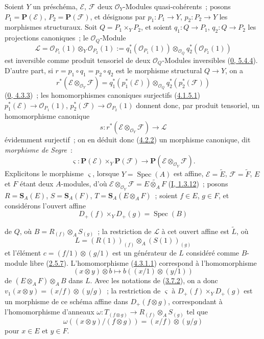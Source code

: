 \begin{env}[4.3.1]
\label{II.4.3.1-fr}
Soient $Y$ un préschéma, $\mathcal{E}$, $\mathcal{F}$ deux
$\mathcal{O}_Y$-Modules quasi-cohérents~; posons
$P_1=\mathbf{P}(\mathcal{E})$, $P_2=\mathbf{P}(\mathcal{F})$, et désignons
par $p_1:P_1\to Y$, $p_2:P_2\to Y$ les morphismes structuraux. Soit
$Q=P_1\times_YP_2$, et soient $q_1:Q\to P_1$, $q_2:Q\to P_2$ les
projections canoniques~; le $\mathcal{O}_Q$-Module
\[
  \mathcal{L}=\mathcal{O}_{P_1}(1)\otimes_Y\mathcal{O}_{P_2}(1)
  :=q_1^*(\mathcal{O}_{P_1}(1))\otimes_{\mathcal{O}_Q}
  q_2^*(\mathcal{O}_{P_2}(1))
\]
est inversible comme produit tensoriel de deux $\mathcal{O}_Q$-Modules
inversibles (\hyperref[0.5.4.4-fr]{0, 5.4.4}). D'autre part, si
$r=p_1\circ q_1=p_2\circ q_2$ est le morphisme structural $Q\to Y$, on a
\[
  r^*(\mathcal{E}\otimes_{\mathcal{O}_Y}\mathcal{F})
  =q_1^*(p_1^*(\mathcal{E}))\otimes_{\mathcal{O}_Q}
  q_2^*(p_2^*(\mathcal{F}))
\]
(\hyperref[0.4.3.3-fr]{0, 4.3.3})~; les homomorphismes canoniques surjectifs
(\hyperref[II.4.1.5.1-fr]{4.1.5.1})
$p_1^*(\mathcal{E})\to\mathcal{O}_{P_1}(1)$,
$p_2^*(\mathcal{F})\to\mathcal{O}_{P_2}(1)$ donnent donc, par produit
tensoriel, un homomorphisme canonique
\[
\label{II.4.3.1.1-fr}
  s:r^*(\mathcal{E}\otimes_{\mathcal{O}_Y}\mathcal{F})\longrightarrow
  \mathcal{L}
\tag{4.3.1.1}
\]
évidemment surjectif~; on en déduit donc
(\hyperref[II.4.2.2-fr]{4.2.2}) un morphisme canonique, dit
\emph{morphisme de Segre}~:
\[
\label{II.4.3.1.2-fr}
  \varsigma:\mathbf{P}(\mathcal{E})\times_Y\mathbf{P}(\mathcal{F})
  \longrightarrow
  \mathbf{P}(\mathcal{E}\otimes_{\mathcal{O}_Y}\mathcal{F}).
\tag{4.3.1.2}
\]
Explicitons le morphisme $\varsigma$, lorsque $Y=\operatorname{Spec}(A)$ est
affine, $\mathcal{E}=\widetilde{E}$, $\mathcal{F}=\widetilde{F}$, $E$ et $F$
étant deux $A$-modules, d'où
$\mathcal{E}\otimes_{\mathcal{O}_Y}\mathcal{F}=\widetilde{E\otimes_A F}$
(\hyperref[I.1.3.12-fr]{I, 1.3.12})~; posons
$R=\mathbf{S}_A(E)$, $S=\mathbf{S}_A(F)$,
$T=\mathbf{S}_A(E\otimes_A F)$~; soient $f\in E$, $g\in F$, et considérons
l'ouvert affine
\[
  D_+(f)\times_YD_+(g)=\operatorname{Spec}(B)
\]


de $Q$, où $B=R_{(f)}\otimes_AS_{(g)}$~; la restriction de $\mathcal{L}$ à
cet ouvert affine est $\widetilde{L}$, où
\[
  L=(R(1))_{(f)}\otimes_A(S(1))_{(g)}
\]
et l'élément $c=(f/1)\otimes(g/1)$ est un générateur de $L$ considéré comme
$B$-module libre (\hyperref[II.2.5.7-fr]{2.5.7}). L'homomorphisme
(\hyperref[II.4.3.1.1-fr]{4.3.1.1}) correspond à l'homomorphisme
\[
  (x\otimes y)\otimes b\longmapsto b((x/1)\otimes(y/1))
\]
de $(E\otimes_A F)\otimes_AB$ dans $L$. Avec les notations de
(\hyperref[II.3.7.2-fr]{3.7.2}), on a donc
$v_1(x\otimes y)=(x/f)\otimes(y/g)$~; la restriction de $\varsigma$ à
$D_+(f)\times_YD_+(g)$ est un morphisme de ce schéma affine dans
$D_+(f\otimes g)$, correspondant à l'homomorphisme d'anneaux
$\omega:T_{(f\otimes g)}\to R_{(f)}\otimes_AS_{(g)}$ tel que
\[
\label{II.4.3.1.3-fr}
  \omega((x\otimes y)/(f\otimes g))=(x/f)\otimes(y/g)
\tag{4.3.1.3}
\]
pour $x\in E$ et $y\in F$.
\end{env}

